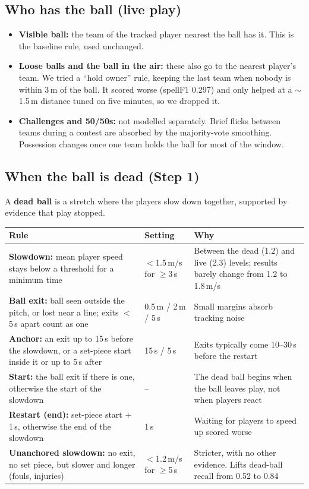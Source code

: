\documentclass[10pt,a4paper]{article}
\begin{document}
\subsection{Who has the ball (live play)}
\begin{itemize}
  \item \textbf{Visible ball:} the team of the tracked player nearest the ball has it. This is the baseline rule,
        used unchanged.
  \item \textbf{Loose balls and the ball in the air:} these also go to the nearest player's team. We tried a
        ``hold owner'' rule, keeping the last team when nobody is within 3\,m of the ball. It scored worse
        (spellF1 0.297) and only helped at a $\sim$1.5\,m distance tuned on five minutes, so we dropped it.
  \item \textbf{Challenges and 50/50s:} not modelled separately. Brief flicks between teams during a contest are
        absorbed by the majority-vote smoothing. Possession changes once one team holds the ball for most of
        the window.
\end{itemize}

\subsection{When the ball is dead (Step 1)}

A \textbf{dead ball} is a stretch where the players slow down together, supported by evidence that play stopped.

\begin{table}[H]
\small
\begin{tabularx}{\linewidth}{@{}p{5.6cm}p{3.0cm}Y@{}}
\toprule
\textbf{Rule} & \textbf{Setting} & \textbf{Why} \\
\midrule
\textbf{Slowdown:} mean player speed stays below a threshold for a minimum time
  & $<$1.5\,m/s for $\geq$3\,s & Between the dead (1.2) and live (2.3) levels; results barely change from 1.2 to 1.8\,m/s \\
\textbf{Ball exit:} ball seen outside the pitch, or lost near a line; exits $<$5\,s apart count as one
  & 0.5\,m / 2\,m / 5\,s & Small margins absorb tracking noise \\
\textbf{Anchor:} an exit up to 15\,s before the slowdown, or a set-piece start inside it or up to 5\,s after
  & 15\,s / 5\,s & Exits typically come 10--30\,s before the restart \\
\textbf{Start:} the ball exit if there is one, otherwise the start of the slowdown
  & -- & The dead ball begins when the ball leaves play, not when players react \\
\textbf{Restart (end):} set-piece start + 1\,s, otherwise the end of the slowdown
  & 1\,s & Waiting for players to speed up scored worse \\
\textbf{Unanchored slowdown:} no exit, no set piece, but slower and longer (fouls, injuries)
  & $<$1.2\,m/s for $\geq$5\,s & Stricter, with no other evidence. Lifts dead-ball recall from 0.52 to 0.84 \\
\bottomrule
\end{tabularx}
\end{table}
\end{document}
